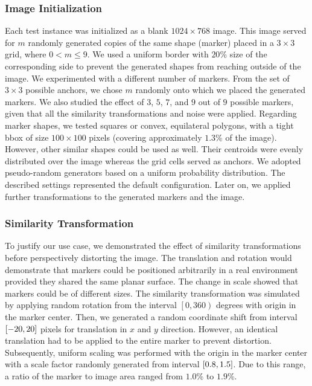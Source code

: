 \subsubsection{Image Initialization}

Each test instance was initialized as a blank $1024 \times 768$ image. This image served for $m$ randomly generated copies of the same shape (marker) placed in a $3 \times 3$ grid, where $0 < m \leq 9$. We used a uniform border with $20$\% size of the corresponding side to prevent the generated shapes from reaching outside of the image. We experimented with a different number of markers. From the set of $3 \times 3$ possible anchors, we chose $m$ randomly onto which we placed the generated markers. We also studied the effect of $3$, $5$, $7$, and $9$ out of $9$ possible markers, given that all the similarity transformations and noise were applied. Regarding marker shapes, we tested squares or convex, equilateral polygons, with a tight \gls{bbox} of size $100 \times 100$ pixels (covering approximately $1.3$\% of the image). However, other similar shapes could be used as well. Their centroids were evenly distributed over the image whereas the grid cells served as anchors. We adopted pseudo-random generators based on a uniform probability distribution. The described settings represented the default configuration. Later on, we applied further transformations to the generated markers and the image.

\subsubsection{Similarity Transformation}

To justify our use case, we demonstrated the effect of similarity transformations before perspectively distorting the image. The translation and rotation would demonstrate that markers could be positioned arbitrarily in a real environment provided they shared the same planar surface. The change in scale showed that markers could be of different sizes. The similarity transformation was simulated by applying random rotation from the interval $\left[0, 360\right)$ degrees with origin in the marker center. Then, we generated a random coordinate shift from interval $\left[ {-20, 20} \right]$ pixels for translation in $x$ and $y$ direction. However, an identical translation had to be applied to the entire marker to prevent distortion. Subsequently, uniform scaling was performed with the origin in the marker center with a scale factor randomly generated from interval $\left[ {0.8, 1.5} \right]$. Due to this range, a ratio of the marker to image area ranged from $1.0$\% to $1.9$\%.

